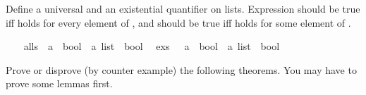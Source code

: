 %
\begin{isabellebody}%
\def\isabellecontext{a{\isadigit{1}}}%
\isamarkupfalse%
%
\isamarkuptrue%
%
\begin{isamarkuptext}%
Define a universal and an existential quantifier on lists.
Expression  should be true iff  holds
for every element  of , and 
should be true iff  holds for some element  of
.%
\end{isamarkuptext}%
\isamarkuptrue%
\ \isanewline
\ \ alls\ {\isacharcolon}{\isacharcolon}\ {\isachardoublequote}{\isacharparenleft}{\isacharprime}a\ {\isasymRightarrow}\ bool{\isacharparenright}\ {\isasymRightarrow}\ {\isacharprime}a\ list\ {\isasymRightarrow}\ bool{\isachardoublequote}\isanewline
\ \ exs\ \ {\isacharcolon}{\isacharcolon}\ {\isachardoublequote}{\isacharparenleft}{\isacharprime}a\ {\isasymRightarrow}\ bool{\isacharparenright}\ {\isasymRightarrow}\ {\isacharprime}a\ list\ {\isasymRightarrow}\ bool{\isachardoublequote}\isamarkupfalse%
%
\begin{isamarkuptext}%
Prove or disprove (by counter example) the following theorems.
You may have to prove some lemmas first.


\end{isamarkuptext}
\end{isabellebody}
